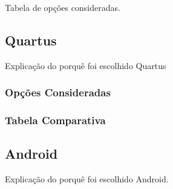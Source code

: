 	Tabela de opções consideradas.
	
	\subsection{Quartus}\label{soft-quartus}
	
	Explicação do porquê foi escolhido Quartus
	
	\subsubsection{Opções Consideradas}\label{quartus-options}

	
	\subsubsection{Tabela Comparativa}\label{quartus-table}
	
	
	\subsection{Android}\label{soft-android}
	
	Explicação do porquê foi escolhido Android.

